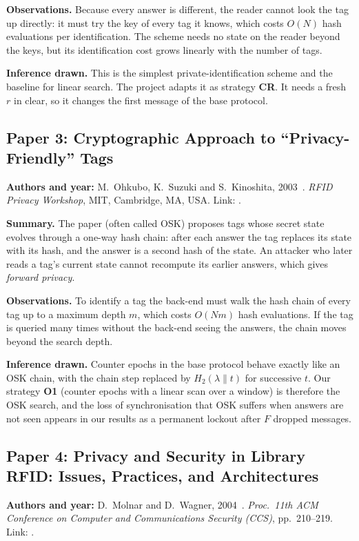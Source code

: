 \textbf{Observations.} Because every answer is different, the reader cannot look the tag up directly: it must try the key of every tag it knows, which costs $O(N)$ hash evaluations per identification. The scheme needs no state on the reader beyond the keys, but its identification cost grows linearly with the number of tags.

\textbf{Inference drawn.} This is the simplest private-identification scheme and the baseline for linear search. The project adapts it as strategy \textbf{CR}. It needs a fresh $r$ in clear, so it changes the first message of the base protocol.

\subsection*{Paper 3: Cryptographic Approach to ``Privacy-Friendly'' Tags}
\textbf{Authors and year:} M.~Ohkubo, K.~Suzuki and S.~Kinoshita, 2003~\cite{ohkubo}. \emph{RFID Privacy Workshop}, MIT, Cambridge, MA, USA. Link: .

\textbf{Summary.} The paper (often called OSK) proposes tags whose secret state evolves through a one-way hash chain: after each answer the tag replaces its state with its hash, and the answer is a second hash of the state. An attacker who later reads a tag's current state cannot recompute its earlier answers, which gives \emph{forward privacy}.

\textbf{Observations.} To identify a tag the back-end must walk the hash chain of every tag up to a maximum depth $m$, which costs $O(Nm)$ hash evaluations. If the tag is queried many times without the back-end seeing the answers, the chain moves beyond the search depth.

\textbf{Inference drawn.} Counter epochs in the base protocol behave exactly like an OSK chain, with the chain step replaced by $H_2(\lambda\|t)$ for successive $t$. Our strategy \textbf{O1} (counter epochs with a linear scan over a window) is therefore the OSK search, and the loss of synchronisation that OSK suffers when answers are not seen appears in our results as a permanent lockout after $F$ dropped messages.

\subsection*{Paper 4: Privacy and Security in Library RFID: Issues, Practices, and Architectures}
\textbf{Authors and year:} D.~Molnar and D.~Wagner, 2004~\cite{molnar}. \emph{Proc.\ 11th ACM Conference on Computer and Communications Security (CCS)}, pp.~210--219. Link: .

